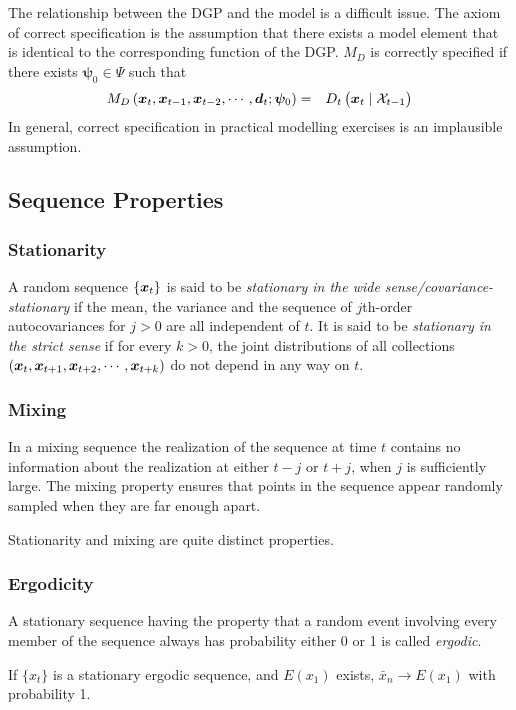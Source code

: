 The relationship between the DGP and the model is a difficult issue. The axiom of correct specification is the assumption that there exists a model element that is identical to the corresponding function of the DGP. $M_{D}$ is correctly specified if there exists $\bm{\psi}_{0}\in\Psi$ such that
\begin{eqnarray*}
M_{D}\left(\bm{x}_{t},\bm{x}_{t-1},\bm{x}_{t-2},\cdots,\bm{d}_{t};\bm{\psi}_{0}\right)&=&D_{t}\left(\bm{x}_{t}\mid\mathcal{X}_{t-1}\right)
\end{eqnarray*}
In general, correct specification in practical modelling exercises is an implausible assumption. 

\subsection{Sequence Properties}
\subsubsection{Stationarity}
A random sequence $\{\bm{x}_{t}\}$ is said to be \textit{stationary in the wide sense/covariance-stationary}
 if the mean, the variance and the sequence of $j$th-order autocovariances for $j>0$ are all independent of $t$. It is said to be \textit{stationary in the strict sense} if for every $k>0$, the joint distributions of all collections $\left(\bm{x}_{t},\bm{x}_{t+1},\bm{x}_{t+2},\cdots,\bm{x}_{t+k}\right)$ do not depend in any way on $t$.

\subsubsection{Mixing}
In a mixing sequence the realization of the sequence at time $t$ contains no information about the realization at either $t-j$ or $t+j$, when $j$ is sufficiently large. The mixing property ensures that points in the sequence appear randomly sampled when they are far enough apart.
\begin{remark}
Stationarity and mixing are quite distinct properties.
\end{remark}

\subsubsection{Ergodicity}
A stationary sequence having the property that a random event involving every member of the sequence always has probability either 0 or 1 is called \textit{ergodic}.
\begin{theorem}
If $\{x_{t}\}$ is a stationary ergodic sequence, and $E(x_1)$ exists, $\bar{x}_{n}\to E(x_{1})$ with probability 1.
\end{theorem}